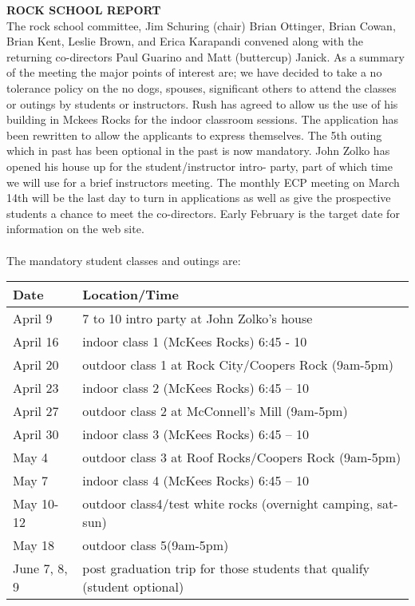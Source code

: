 \documentclass[10pt,a4paper]{article}
\begin{document}
\begin{multicols}{2}
\textbf{ROCK SCHOOL REPORT}\\
The rock school committee, Jim Schuring (chair) Brian Ottinger, Brian Cowan, Brian Kent, Leslie Brown, and Erica Karapandi convened along with the returning co-directors Paul Guarino and Matt (buttercup) Janick. As a summary of the meeting the major points of interest are; we have decided to take a no tolerance policy on the no dogs, spouses, significant others to attend the classes or outings by students or instructors. Rush has agreed to allow us the use of his building in Mckees Rocks for the indoor classroom sessions. The application has been rewritten to allow the applicants to express themselves. The 5th outing which in past has been optional in the past is now mandatory. John Zolko has opened his house up for the student/instructor intro- party, part of which time we will use for a brief instructors meeting. The monthly ECP meeting on March 14th will be the last day to turn in applications as well as give the prospective students a chance to meet the co-directors. Early February is the target date for information on the web site.
\\
\\
The mandatory student classes and outings are:\\
\begin{center}
    \begin{tabular}{ | l | p{6cm} | }
    \hline
    \textbf{Date} & \textbf{Location/Time} \\\hline
	April 9  &  	7 to 10 intro party at John Zolko's house\\
	April 16	 & indoor class 1 (McKees Rocks) 6:45 - 10\\
	April 20	 &	outdoor class 1 at Rock City/Coopers Rock (9am-5pm)\\
	April 23	 &	indoor class 2 (McKees Rocks) 6:45 – 10\\
	April 27 &		outdoor class 2 at McConnell's Mill (9am-5pm)\\
	April 30	 &	indoor class 3 (McKees Rocks) 6:45 – 10\\
	May 4 &		outdoor class 3 at Roof Rocks/Coopers Rock (9am-5pm)\\
	May 7 &		indoor class 4 (McKees Rocks) 6:45 – 10\\
	May 10-12 &	outdoor class4/test white rocks (overnight camping, sat-sun)\\
	May 18 &		outdoor class 5(9am-5pm)\\
	June 7, 8, 9 &	post graduation trip for those students that qualify (student optional)\\\hline
    \end{tabular}
\end{center}





\end{multicols}
\end{document}

